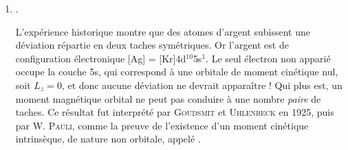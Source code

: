 \documentclass[12pt,fancy]{cours}
\begin{document}
\begin{enumerate}
\begin{table}[h!]
  \end{table}

  \item {}. 
  
  
  L'expérience historique montre que des atomes d'argent subissent une déviation répartie en deux taches symétriques. Or l'argent est de configuration électronique [Ag] = [Kr]4d$^{10}$5s$^1$. Le seul électron non apparié occupe la couche 5s, qui correspond à une orbitale de moment cinétique nul, soit $L_z = 0$, et donc aucune déviation ne devrait apparaître ! Qui plus est, un moment magnétique orbital ne peut pas conduire à une nombre \emph{paire} de taches.
  Ce résultat fut interprété par \textsc{Goudsmit} et \textsc{Uhlenbeck} en 1925, puis par W. \textsc{Pauli}, comme la preuve de l'existence d'un moment cinétique intrinsèque, de nature non orbitale, appelé . 
  

\end{enumerate}
\end{document}
